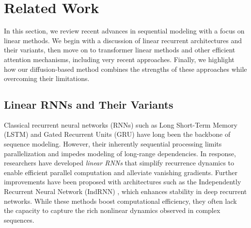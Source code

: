 \section{Related Work}

In this section, we review recent advances in sequential modeling with a focus on linear methods. We begin with a discussion of linear recurrent architectures and their variants, then move on to transformer linear methods and other efficient attention mechanisms, including very recent approaches. Finally, we highlight how our diffusion-based method combines the strengths of these approaches while overcoming their limitations.

\subsection{Linear RNNs and Their Variants}
Classical recurrent neural networks (RNNs) such as Long Short-Term Memory (LSTM) \cite{hochreiter1997long} and Gated Recurrent Units (GRU) have long been the backbone of sequence modeling. However, their inherently sequential processing limits parallelization and impedes modeling of long-range dependencies. In response, researchers have developed \emph{linear RNNs} that simplify recurrence dynamics to enable efficient parallel computation and alleviate vanishing gradients. Further improvements have been proposed with architectures such as the Independently Recurrent Neural Network (IndRNN) \cite{li2018indrnn}, which enhances stability in deep recurrent networks. While these methods boost computational efficiency, they often lack the capacity to capture the rich nonlinear dynamics observed in complex sequences. 

